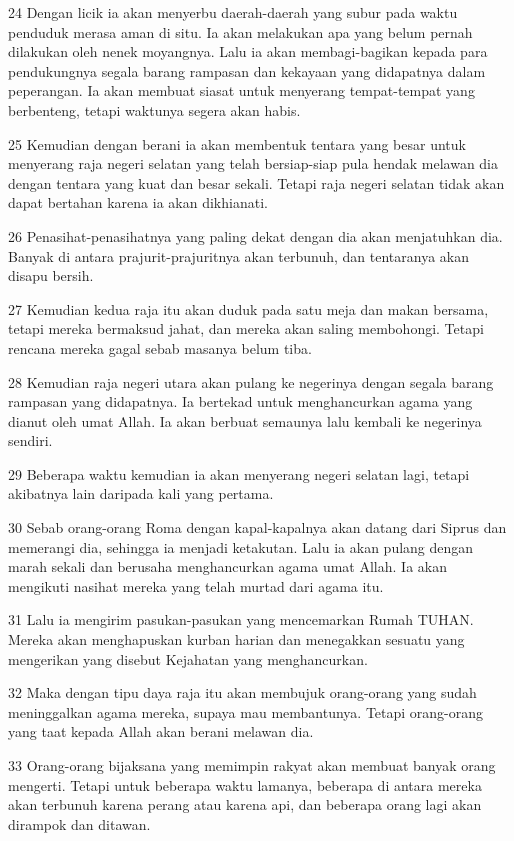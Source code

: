\par 24 Dengan licik ia akan menyerbu daerah-daerah yang subur pada waktu penduduk merasa aman di situ. Ia akan melakukan apa yang belum pernah dilakukan oleh nenek moyangnya. Lalu ia akan membagi-bagikan kepada para pendukungnya segala barang rampasan dan kekayaan yang didapatnya dalam peperangan. Ia akan membuat siasat untuk menyerang tempat-tempat yang berbenteng, tetapi waktunya segera akan habis.
\par 25 Kemudian dengan berani ia akan membentuk tentara yang besar untuk menyerang raja negeri selatan yang telah bersiap-siap pula hendak melawan dia dengan tentara yang kuat dan besar sekali. Tetapi raja negeri selatan tidak akan dapat bertahan karena ia akan dikhianati.
\par 26 Penasihat-penasihatnya yang paling dekat dengan dia akan menjatuhkan dia. Banyak di antara prajurit-prajuritnya akan terbunuh, dan tentaranya akan disapu bersih.
\par 27 Kemudian kedua raja itu akan duduk pada satu meja dan makan bersama, tetapi mereka bermaksud jahat, dan mereka akan saling membohongi. Tetapi rencana mereka gagal sebab masanya belum tiba.
\par 28 Kemudian raja negeri utara akan pulang ke negerinya dengan segala barang rampasan yang didapatnya. Ia bertekad untuk menghancurkan agama yang dianut oleh umat Allah. Ia akan berbuat semaunya lalu kembali ke negerinya sendiri.
\par 29 Beberapa waktu kemudian ia akan menyerang negeri selatan lagi, tetapi akibatnya lain daripada kali yang pertama.
\par 30 Sebab orang-orang Roma dengan kapal-kapalnya akan datang dari Siprus dan memerangi dia, sehingga ia menjadi ketakutan. Lalu ia akan pulang dengan marah sekali dan berusaha menghancurkan agama umat Allah. Ia akan mengikuti nasihat mereka yang telah murtad dari agama itu.
\par 31 Lalu ia mengirim pasukan-pasukan yang mencemarkan Rumah TUHAN. Mereka akan menghapuskan kurban harian dan menegakkan sesuatu yang mengerikan yang disebut Kejahatan yang menghancurkan.
\par 32 Maka dengan tipu daya raja itu akan membujuk orang-orang yang sudah meninggalkan agama mereka, supaya mau membantunya. Tetapi orang-orang yang taat kepada Allah akan berani melawan dia.
\par 33 Orang-orang bijaksana yang memimpin rakyat akan membuat banyak orang mengerti. Tetapi untuk beberapa waktu lamanya, beberapa di antara mereka akan terbunuh karena perang atau karena api, dan beberapa orang lagi akan dirampok dan ditawan.
